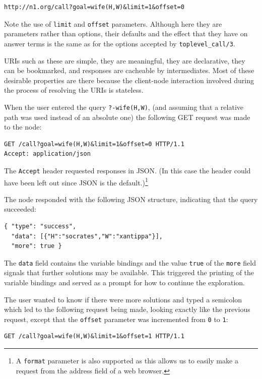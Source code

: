 \begin{verbatim}
http://n1.org/call?goal=wife(H,W)&limit=1&offset=0
\end{verbatim}

\noindent Note the use of \texttt{limit} and \texttt{offset} parameters. Although here they are parameters rather than options, their defaults and the effect that they have on answer terms is the same as for the options accepted by \texttt{toplevel\_call/3}. 

URIs such as these are simple, they are meaningful, they are declarative, they can be bookmarked, and responses are cacheable by intermediates. Most of these desirable properties are there because the client-node interaction involved during the process of resolving the URIs is stateless. 

When the user entered the query \texttt{?-wife(H,W)}, (and assuming that a relative path was used instead of an absolute one) the following GET request was made to the node:

\begin{verbatim}
GET /call?goal=wife(H,W)&limit=1&offset=0 HTTP/1.1
Accept: application/json
\end{verbatim}

\noindent The \texttt{Accept} header requested responses in JSON. (In this case the header could have been left out since JSON is the default.)\footnote{A \texttt{format} parameter is also supported as this allows us to easily make a request from the address field of a web browser.}

The node responded with the following JSON structure, indicating that the query succeeded: 

\begin{verbatim}
{ "type": "success",
  "data": [{"H":"socrates","W":"xantippa"}], 
  "more": true }
\end{verbatim}

\noindent The \texttt{data} field contains the variable bindings and the value \texttt{true} of the \texttt{more} field signals that further solutions may be available. This triggered the printing of the variable bindings and served as a prompt for how to continue the exploration.

The user wanted to know if there were more solutions and typed a semicolon which led to the following request being made, looking exactly like the previous request, except that the \texttt{offset} parameter was incremented from \texttt{0} to \texttt{1}:

\begin{verbatim}
GET /call?goal=wife(H,W)&limit=1&offset=1 HTTP/1.1
\end{verbatim}

